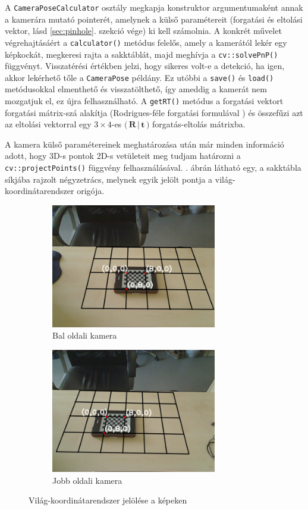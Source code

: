 A \texttt{CameraPoseCalculator} osztály megkapja konstruktor argumentumaként annak a kamerára mutató pointerét, amelynek a külső paramétereit (forgatási és eltolási vektor, lásd \ref{sec:pinhole}. szekció vége) ki kell számolnia. A konkrét művelet végrehajtásáért a \texttt{calculator()} metódus felelős, amely a kamerától lekér egy képkockát, megkeresi rajta a sakktáblát, majd meghívja a \texttt{cv::solvePnP()} függvényt. Visszatérési értékben jelzi, hogy sikeres volt-e a detekció, ha igen, akkor lekérhető tőle a \texttt{CameraPose} példány. Ez utóbbi a \texttt{save()} és \texttt{load()} metódusokkal elmenthető és visszatölthető, így ameddig a kamerát nem mozgatjuk el, ez újra felhasználható. A \texttt{getRT()} metódus a forgatási vektort forgatási mátrix-szá alakítja (Rodrigues-féle forgatási formulával \cite{camera-calib-3d}) és összefűzi azt az eltolási vektorral egy $3\times 4$-es $\Big(\,\mathbf{R}\,|\,\mathbf{t}\,\Big)$ forgatás-eltolás mátrixba.

A kamera külső paramétereinek meghatározása után már minden információ adott, hogy 3D-s pontok 2D-s vetületeit meg tudjam határozni a \texttt{cv::projectPoints()} függvény felhasználásával. . ábrán látható egy, a sakktábla síkjába rajzolt négyzetrács, melynek egyik jelölt pontja a világ-koordinátarendszer origója.

\begin{figure}[tbh]
\centering
\begin{subfigure}[b]{.49\linewidth}
	\centering
	\includegraphics[width=205pt]{figures/pose0_180.png}
	\caption{Bal oldali kamera}
  \end{subfigure}
\begin{subfigure}[b]{.49\linewidth}
	\centering
	\includegraphics[width=205pt]{figures/pose1_180.png}
	\caption{Jobb oldali kamera}
  \end{subfigure}
\caption{Világ-koordinátarendszer jelölése a képeken \label{fig:pose}}
\end{figure}

